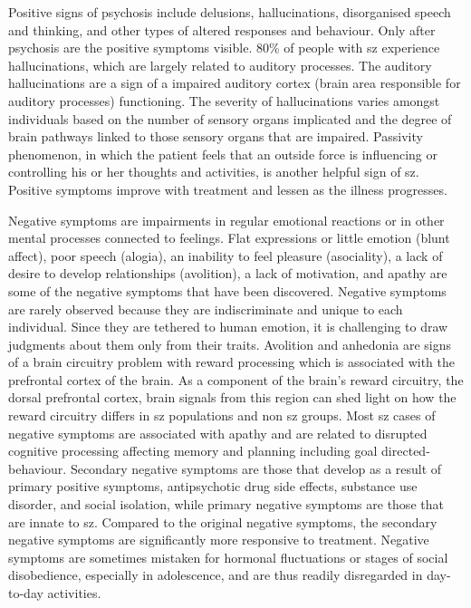 Positive signs of psychosis include delusions, hallucinations, disorganised speech and thinking, and other types of altered responses and 
behaviour. Only after psychosis are the positive symptoms visible. 80\% of people with \ac{sz} experience hallucinations, which 
are largely related to auditory processes. The auditory hallucinations are a sign of a impaired auditory cortex (brain area responsible 
for auditory processes) functioning. The severity of hallucinations varies amongst individuals based on the number of sensory organs implicated and 
the degree of brain pathways linked to those sensory organs that are impaired. Passivity phenomenon, in which the patient feels that an 
outside force is influencing or controlling his or her thoughts and activities, is another helpful sign of \ac{sz}. Positive 
symptoms improve with treatment and lessen as the illness progresses.

Negative symptoms are impairments in regular emotional reactions or in other mental processes connected to feelings. Flat expressions or 
little emotion (blunt affect), poor speech (alogia), an inability to feel pleasure (asociality), a lack of desire to develop 
relationships (avolition), a lack of motivation, and apathy are some of the negative symptoms that have been discovered. Negative 
symptoms are rarely observed because they are indiscriminate and unique to each individual. Since they are tethered to human emotion, 
it is challenging to draw judgments about them only from their traits. Avolition and anhedonia are signs of a brain circuitry problem 
with reward processing which is associated with the prefrontal cortex of the brain. As a component of the brain's reward circuitry, the dorsal prefrontal cortex, brain signals from this region can shed light on how the reward circuitry differs in \ac{sz} populations and non \ac{sz} groups. Most \ac{sz} cases of negative symptoms are  associated with apathy and  are related to disrupted cognitive processing affecting memory and planning including goal directed-behaviour. 
Secondary negative symptoms are those that develop as a result of primary positive symptoms, antipsychotic drug side effects, substance 
use disorder, and social isolation, while primary negative symptoms are those that are innate to \ac{sz}. Compared to the original 
negative symptoms, the secondary negative symptoms are significantly more responsive to treatment. Negative symptoms are sometimes 
mistaken for hormonal fluctuations or stages of social disobedience, especially in adolescence, and are thus readily disregarded in 
day-to-day activities.

